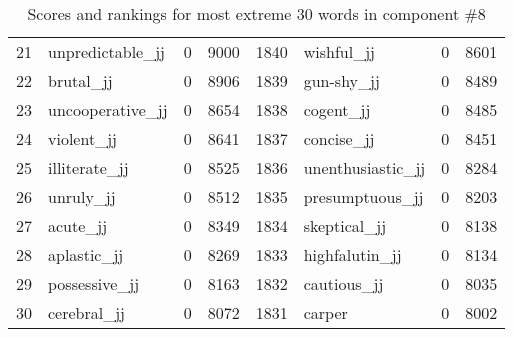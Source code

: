 \begin{table}[tbp]
\begin{tabular}{| rlr@{.}l | rlr@{.}l |}
    21 & unpredictable\_jj & 0 & 9000    &    1840 & wishful\_jj & 0 & 8601 \\
    22 & brutal\_jj & 0 & 8906    &    1839 & gun-shy\_jj & 0 & 8489 \\
    23 & uncooperative\_jj & 0 & 8654    &    1838 & cogent\_jj & 0 & 8485 \\
    24 & violent\_jj & 0 & 8641    &    1837 & concise\_jj & 0 & 8451 \\
    25 & illiterate\_jj & 0 & 8525    &    1836 & unenthusiastic\_jj & 0 & 8284 \\
    26 & unruly\_jj & 0 & 8512    &    1835 & presumptuous\_jj & 0 & 8203 \\
    27 & acute\_jj & 0 & 8349    &    1834 & skeptical\_jj & 0 & 8138 \\
    28 & aplastic\_jj & 0 & 8269    &    1833 & highfalutin\_jj & 0 & 8134 \\
    29 & possessive\_jj & 0 & 8163    &    1832 & cautious\_jj & 0 & 8035 \\
    30 & cerebral\_jj & 0 & 8072    &    1831 & carper & 0 & 8002 \\
    \hline
    \end{tabular}
    \caption{Scores and rankings for most extreme 30 words in component \#8} 
\end{table}
\clearpage
